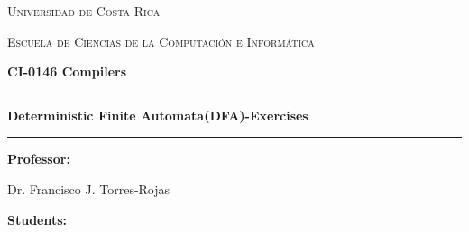 \documentclass[12pt]{article}
\begin{document}

\begin{titlepage}

    \centering

    \vspace*{1.5cm}

    {\Large\textsc{Universidad de Costa Rica}\par}

    \vspace{0.7cm}

    {\large\textsc{Escuela de Ciencias de la Computación e Informática}\par}

    \vspace{0.8cm}

    {\large\textbf{CI-0146 Compilers}\par}


    \vspace{2.5cm}
    \rule{0.99\textwidth}{0.6pt}
    \vspace{0.1cm}
    {\LARGE\textbf{Deterministic Finite Automata(DFA)-Exercises}\par}
    \vspace{0.1cm}
    \rule{0.99\textwidth}{0.6pt}

    \vspace{2.2cm}

    \noindent
    \begin{minipage}[t]{0.45\textwidth}
        \raggedright

        \textbf{Professor:}

        \vspace{0.25cm}

        Dr. Francisco J. Torres-Rojas

    \end{minipage}
    \hfill
    \begin{minipage}[t]{0.45\textwidth}
        \raggedleft

        \textbf{Students:}

        \vspace{0.25cm}


\end{minipage}
\end{titlepage}
\end{document}

